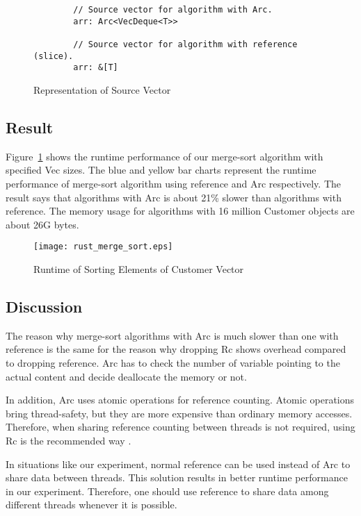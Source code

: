 \begin{figure}[htb]
    \begin{lstlisting}
        // Source vector for algorithm with Arc.
        arr: Arc<VecDeque<T>>

        // Source vector for algorithm with reference (slice).
        arr: &[T]
    \end{lstlisting}
    \caption{Representation of Source Vector}
    \label{fig:source_merge_sort}
\end{figure}


\subsection{Result}
Figure~\ref{fig:source_merge_sort} shows the runtime performance of our merge-sort algorithm with specified Vec sizes. 
The blue and yellow bar charts represent the runtime performance of merge-sort algorithm using reference and Arc respectively. 
The result says that algorithms with Arc is about 21\% slower than algorithms with reference.
The memory usage for algorithms with 16 million Customer objects are about 26G bytes.

\begin{figure}[htb]
    \texttt{[image: rust\_merge\_sort.eps]}
    \caption{Runtime of Sorting Elements of Customer Vector}
    \label{fig:merge_sort}
\end{figure}

\subsection{Discussion}
The reason why merge-sort algorithms with Arc is much slower than one with reference is 
the same for the reason why dropping Rc shows overhead compared to dropping reference.
Arc has to check the number of variable pointing to the actual content and decide 
deallocate the memory or not.

In addition, Arc uses atomic operations for reference counting. Atomic operations bring thread-safety, but they are more expensive than ordinary memory accesses.
Therefore, when sharing reference counting between threads is not required, using Rc is the recommended way \cite{RustArcPage}.

In situations like our experiment, normal reference can be used instead of Arc to share data between threads. 
This solution results in better runtime performance in our experiment. Therefore, one should use reference to share data among different threads 
whenever it is possible.

